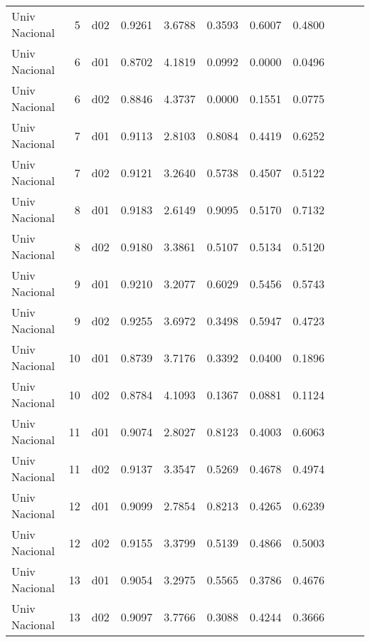 \begin{landscape}
\begin{longtable}{p{2cm}rrrrrrrrrr}
           Univ Nacional  &          5 &     d02 &   0.9261 &  3.6788 &        0.3593 &           0.6007 &  0.4800 \\
           Univ Nacional  &          6 &     d01 &   0.8702 &  4.1819 &        0.0992 &           0.0000 &  0.0496 \\
           Univ Nacional  &          6 &     d02 &   0.8846 &  4.3737 &        0.0000 &           0.1551 &  0.0775 \\
           Univ Nacional  &          7 &     d01 &   0.9113 &  2.8103 &        0.8084 &           0.4419 &  0.6252 \\
           Univ Nacional  &          7 &     d02 &   0.9121 &  3.2640 &        0.5738 &           0.4507 &  0.5122 \\
           Univ Nacional  &          8 &     d01 &   0.9183 &  2.6149 &        0.9095 &           0.5170 &  0.7132 \\
           Univ Nacional  &          8 &     d02 &   0.9180 &  3.3861 &        0.5107 &           0.5134 &  0.5120 \\
           Univ Nacional  &          9 &     d01 &   0.9210 &  3.2077 &        0.6029 &           0.5456 &  0.5743 \\
           Univ Nacional  &          9 &     d02 &   0.9255 &  3.6972 &        0.3498 &           0.5947 &  0.4723 \\
           Univ Nacional  &         10 &     d01 &   0.8739 &  3.7176 &        0.3392 &           0.0400 &  0.1896 \\
           Univ Nacional  &         10 &     d02 &   0.8784 &  4.1093 &        0.1367 &           0.0881 &  0.1124 \\
           Univ Nacional  &         11 &     d01 &   0.9074 &  2.8027 &        0.8123 &           0.4003 &  0.6063 \\
           Univ Nacional  &         11 &     d02 &   0.9137 &  3.3547 &        0.5269 &           0.4678 &  0.4974 \\
           Univ Nacional  &         12 &     d01 &   0.9099 &  2.7854 &        0.8213 &           0.4265 &  0.6239 \\
           Univ Nacional  &         12 &     d02 &   0.9155 &  3.3799 &        0.5139 &           0.4866 &  0.5003 \\
           Univ Nacional  &         13 &     d01 &   0.9054 &  3.2975 &        0.5565 &           0.3786 &  0.4676 \\
           Univ Nacional  &         13 &     d02 &   0.9097 &  3.7766 &        0.3088 &           0.4244 &  0.3666 \\

\end{longtable}
\end{landscape}
